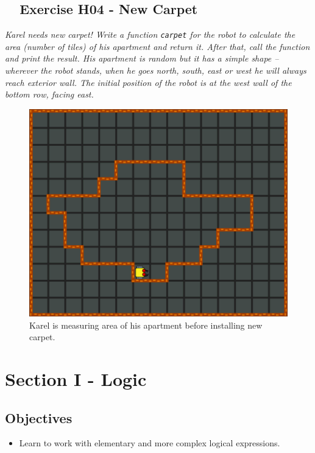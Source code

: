 {{{{\subsection{\ \ Exercise H04 - New Carpet}

{\em Karel needs new carpet! Write a function {\tt carpet} for the robot to calculate 
the area (number of tiles) of his apartment and return it. After that, call the function 
and print the result. His apartment is random but it has a simple shape -- wherever 
the robot stands, when he goes north, south, east or west he will always reach exterior wall.
The initial position of the robot is at the west wall of the bottom row, facing east.}
\newpage
\begin{figure}[!ht]
\begin{center}
\includegraphics[height=0.4\textwidth]{imgk/h04.png}
\end{center}
\vspace{-4mm}
\caption{Karel is measuring area of his apartment before installing new carpet.}
\label{fig:h04}
\vspace{-4mm}
\end{figure}
\noindent


\section{Section I - Logic} \label{sec:logic}

\subsection{Objectives} 
 
\begin{itemize}
\item Learn to work with elementary and more complex logical expressions.
\end{itemize}

}}}}
